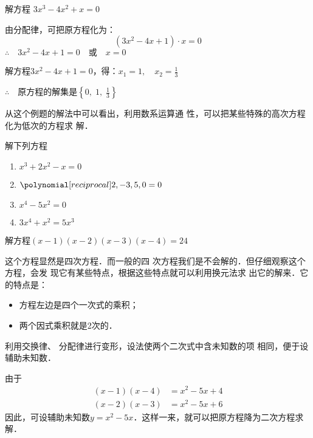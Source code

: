 \begin{example}
    解方程 $3x^3-4x^2+x=0$
\end{example}

\begin{solution}
由分配律，可把原方程化为：
\[(3x^2-4x+1)\cdot x=0\]
$\therefore\quad 3x^2-4x+1=0\quad \text{或}\quad x=0$

解方程$3x^2-4x+1=0$，得：$x_1=1,\quad x_2=\frac{1}{3}$

$\therefore\quad $原方程的解集是$\left\{0,\; 1,\; \frac{1}{3}\right\}$
\end{solution}

从这个例题的解法中可以看出，利用数系运算通
性，可以把某些特殊的高次方程化为低次的方程求
解．






\begin{ex}
解下列方程
\begin{multicols}{2}   
\begin{enumerate}
    \item $x^3+2x^2-x=0$
    \item $\poly{2,-3,5,0}=0$
    \item $x^4-5x^2=0$
    \item $3x^4+x^2=5x^3$
\end{enumerate}
\end{multicols} 
\end{ex}



\begin{example}
解方程$(x-1)(x-2)(x-3)(x-4)=24$ 
\end{example}

\begin{analyze}
    这个方程显然是四次方程．而一般的四
次方程我们是不会解的．但仔细观察这个方程，会发
现它有某些特点，根据这些特点就可以利用换元法求
出它的解来．它的特点是：
\begin{itemize}
    \item 方程左边是四个一次式的乘积；
    \item 两个因式乘积就是2次的．
\end{itemize}
利用交换律、
分配律进行变形，设法使两个二次式中含未知数的项
相同，便于设辅助未知数．

由于
\[\begin{split}
    (x-1)(x-4)&=x^2-5x+4\\
    (x-2)(x-3)&=x^2-5x+6
\end{split}\]
因此，可设辅助未知数$y=x^2-5x$．这样一来，就可以把原方程降为二次方程求解．
\end{analyze}

